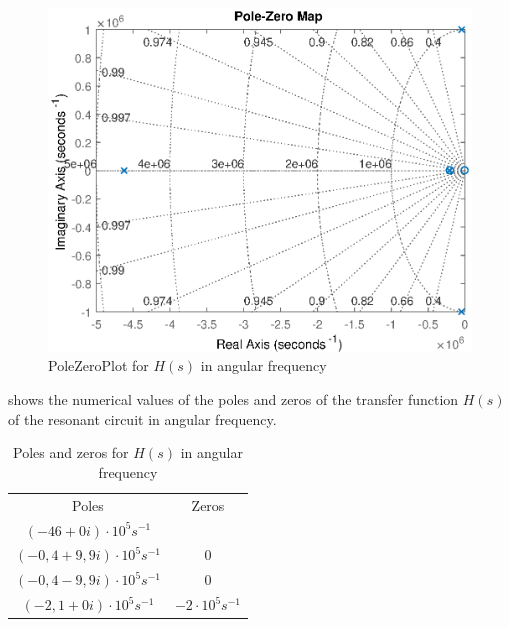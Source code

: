 \begin{figure}[H]
    \centering
    \includegraphics[width=\textwidth]{img/CoilRigPoleZeroPlot.eps}
    \caption{PoleZeroPlot for $H(s)$ in angular frequency}
    \label{fig:polezero}
\end{figure}

 shows the numerical values of the poles and zeros of the transfer function $H(s)$ of the resonant circuit in angular frequency.

\begin{table}[H]
    \centering
    \begin{tabular}{c|c}
        Poles & Zeros \\
        $(-46 + 0i)   \cdot 10^{5} s^{-1}$ & \\
        $(-0,4 + 9,9i)\cdot 10^{5} s^{-1}$ & $0$ \\
        $(-0,4 - 9,9i)\cdot 10^{5} s^{-1}$ & $0$ \\
        $(-2,1 + 0i)  \cdot 10^{5} s^{-1}$ & $-2\cdot 10^{5} s^{-1}$ \\
    \end{tabular}
    \caption{Poles and zeros for $H(s)$ in angular frequency}
    \label{tab:coilrigpoles}
\end{table}


